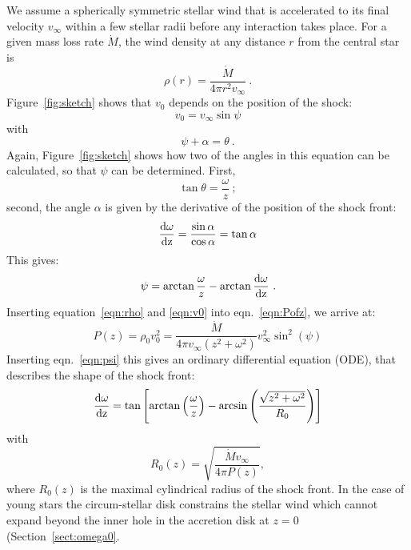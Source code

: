 \documentclass[manuscript]{aastex}
\begin{document}
We assume a spherically symmetric stellar wind that is accelerated to its final velocity $v_{\infty}$ within a few stellar radii before any interaction takes place. For a given mass loss rate $\dot M$, the wind density at any distance $r$ from the central star is 
\begin{equation}\label{eqn:rho}
\rho(r) = \frac{\dot M}{4 \pi r^2 v_{\infty}}\ .
\end{equation}
Figure~\ref{fig:sketch} shows that $v_0$ depends on the position of the shock:
\begin{equation}
\label{eqn:v0}v_0 = v_{\infty} \sin \psi
\end{equation}
with 
\begin{equation}\label{eqn:angle}
\psi+\alpha =  \theta \ .
\end{equation}
Again, Figure~\ref{fig:sketch} shows how two of the angles in this equation can be calculated, so that $\psi$ can be determined. First,
\begin{equation}\label{eqn:theta}
\tan\theta = \frac{\omega}{z}\ ;
\end{equation}
second, the angle $\alpha$ is given by the derivative of the position of the shock front:
\begin{equation}\label{eqn:deriv}
\frac{\rm{d}\omega}{\rm{d}z} = \frac{\sin \alpha}{\cos \alpha} = \tan{\alpha}
\end{equation}
This gives:
\begin{equation}\label{eqn:psi}
\psi = \arctan{\frac{\omega}{z}} - \arctan{\frac{\rm{d}\omega}{\rm{d}z}}\ .
\end{equation}
Inserting equation~\ref{eqn:rho} and \ref{eqn:v0} into eqn.~\ref{eqn:Pofz}, we arrive at: 
\begin{equation}\label{eqn:P}
P(z) = \rho_0 v_0^2 = \frac{\dot{M}}{4\pi v_{\infty}(z^2+\omega^2)} v_{\infty}^2 \sin^2(\psi)
\end{equation}
Inserting eqn.~\ref{eqn:psi} this gives an ordinary differential equation (ODE), that describes the shape of the shock front:
\begin{equation}\label{eqn:ode}
\frac{\rm{d}\omega}{\rm{d}z} = \tan\left[\arctan\left(\frac{\omega}{z}\right)-\arcsin\left(\frac{\sqrt{z^2+\omega^2}}{R_0}\right)\right]
\end{equation}
with
\begin{equation}\label{eqn:r0}
R_0(z) = \sqrt{\frac{\dot{M} v_{\infty}}{4\pi P(z)}},
\end{equation}
where $R_0(z)$ is the maximal cylindrical radius of the shock front. In the case of young stars the circum-stellar disk constrains the stellar wind which cannot expand beyond the inner hole in the accretion disk at $z=0$ (Section~\ref{sect:omega0}.
\end{document}

